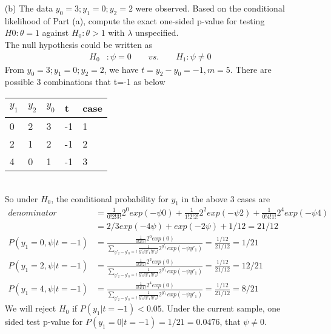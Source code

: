 \documentclass[11pt]{article} %
\begin{document}
\begin{itemize}
	\item[(b)] The data $y_0 = 3; y_1 = 0; y_2 = 2$ were observed. Based on the conditional likelihood
	of Part (a), compute the exact one-sided p-value for testing $H0 : \theta = 1$ against $H_0 : \theta > 1$ with $\lambda$ unspecified.\\
	The null hypothesis could be written as 
	\begin{align*}
		H_0  &: \psi = 0 \qquad vs. \qquad H_1: \psi \neq 0
	\end{align*} 
	From $y_0 = 3; y_1 = 0; y_2 = 2$, we have $t= y_2 - y_0 = -1, m=5$. There are possible 3 combinations that t=-1 as below\\
	\begin{tabular}{l l l l l}
		$y_1$ &  $y_2$ & $y_0$ & t & case\\\hline
		0 & 2  & 3 & -1 & 1\\
		2 & 1  & 2 & -1 & 2\\
		4 & 0  & 1 & -1 & 3\\
		\hline
	\end{tabular}\\
	So under $H_0$, the conditional probability for $y_1$ in the above 3 cases are
	\begin{align*}
		denominator &= \frac{1}{0!2!3!}2^{0} exp(-\psi {0}) + \frac{1}{1!2!2!}2^{2} exp(-\psi {2}) + \frac{1}{0!4!1!}2^{4} exp(-\psi {4}) \\
		&= 2/3 exp(-4\psi) + exp(-2\psi) + 1/12 = 21/12\\
		P(y_1=0, \psi |t=-1)  &=  \frac{\frac{1}{0!2!3!}2^{0}exp(0) }{\sum_{y'_2-y'_0=t} \frac{1}{y'_0!y'_1!y'_2!}2^{y'_1} exp(-\psi {y'_1})} = \frac{1/12}{21/12} = 1/21\\
		P(y_1=2, \psi |t=-1)  &=  \frac{\frac{1}{1!2!2!}2^{2}exp(0) }{\sum_{y'_2-y'_0=t} \frac{1}{y'_0!y'_1!y'_2!}2^{y'_1} exp(-\psi {y'_1})} = \frac{1/12}{21/12} = 12/21\\
		P(y_1=4, \psi |t=-1)  &=  \frac{\frac{1}{0!4!1!}2^{4}exp(0) }{\sum_{y'_2-y'_0=t} \frac{1}{y'_0!y'_1!y'_2!}2^{y'_1} exp(-\psi {y'_1})} = \frac{1/12}{21/12} = 8/21
	\end{align*} 
	We will reject $H_0$ if $P(y_1|t=-1) < 0.05$. Under the current sample, one sided test p-value for $P(y_1=0|t=-1) = 1/21 = 0.0476$, that $\psi \neq 0$.
\end{itemize}
\end{document}
